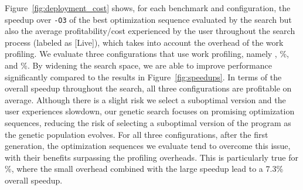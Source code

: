 Figure~\ref{fig:deployment_cost} shows, for each benchmark and configuration, the speedup over \texttt{-O3} of the best optimization sequence
evaluated by the search but also the average profitability/cost experienced by the user throughout the search process (labeled as [Live]),
which takes into account the overhead of the work profiling. We evaluate three configurations that use work profiling, namely \OptProf,
\%, and \%. By widening the search space, we are able to improve performance significantly compared to the results in
Figure~\ref{fig:speedups}. In terms of the overall speedup throughout the search, all three configurations are profitable on average. 
Although there is a slight risk we select a suboptimal version and the user experiences slowdown, our genetic search focuses on promising
optimization sequences, reducing the risk of selecting a suboptimal version of the program as the genetic population evolves. For all three
configurations, after the first generation, the optimization sequences we evaluate tend to overcome this issue, with their benefits
surpassing the profiling overheads. This is particularly true for \%, where the small overhead combined with the large speedup
lead to a 7.3\% overall speedup.
